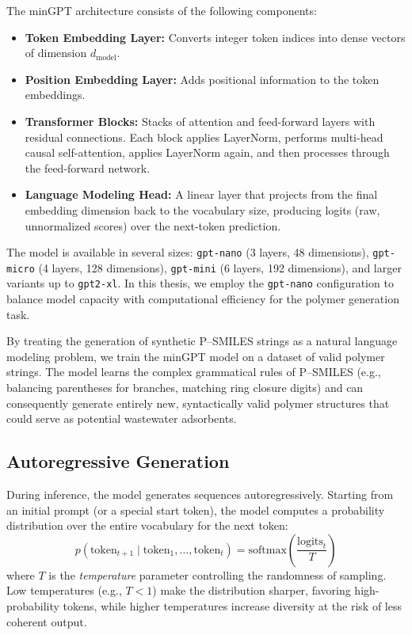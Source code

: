 The minGPT architecture consists of the following components:
\begin{itemize}
	\item \textbf{Token Embedding Layer:} Converts integer token indices into dense vectors of dimension $d_{\text{model}}$.
	\item \textbf{Position Embedding Layer:} Adds positional information to the token embeddings.
	\item \textbf{Transformer Blocks:} Stacks of attention and feed-forward layers with residual connections. Each block applies LayerNorm, performs multi-head causal self-attention, applies LayerNorm again, and then processes through the feed-forward network.
	\item \textbf{Language Modeling Head:} A linear layer that projects from the final embedding dimension back to the vocabulary size, producing logits (raw, unnormalized scores) over the next-token prediction.
\end{itemize}

The model is available in several sizes: \texttt{gpt-nano} (3 layers, 48 dimensions), \texttt{gpt-micro} (4 layers, 128 dimensions), \texttt{gpt-mini} (6 layers, 192 dimensions), and larger variants up to \texttt{gpt2-xl}. In this thesis, we employ the \texttt{gpt-nano} configuration to balance model capacity with computational efficiency for the polymer generation task.

By treating the generation of synthetic P--SMILES strings as a natural language modeling problem, we train the minGPT model on a dataset of valid polymer strings. The model learns the complex grammatical rules of P--SMILES (e.g., balancing parentheses for branches, matching ring closure digits) and can consequently generate entirely new, syntactically valid polymer structures that could serve as potential wastewater adsorbents.

\subsection{Autoregressive Generation}
\label{sec:autoregressive_generation}

During inference, the model generates sequences autoregressively. Starting from an initial prompt (or a special start token), the model computes a probability distribution over the entire vocabulary for the next token:
\begin{equation}
	p(\text{token}_{t+1} \mid \text{token}_1, \ldots, \text{token}_t) = \text{softmax}\left(\frac{\text{logits}_t}{T}\right)
\end{equation}
where $T$ is the \emph{temperature} parameter controlling the randomness of sampling. Low temperatures (e.g., $T < 1$) make the distribution sharper, favoring high-probability tokens, while higher temperatures increase diversity at the risk of less coherent output.

